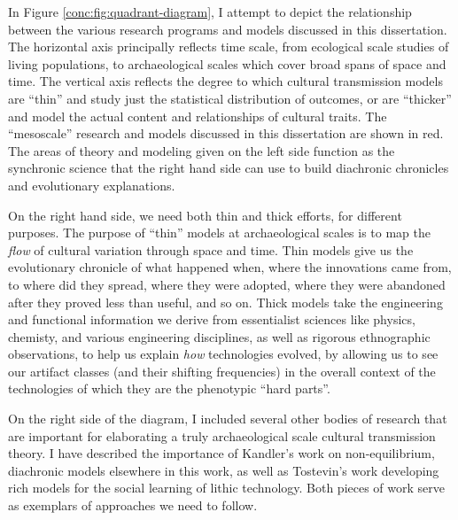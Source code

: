 In Figure \ref{conc:fig:quadrant-diagram}, I attempt to depict the relationship between the various research programs and models discussed in this dissertation.  The horizontal axis principally reflects time scale, from ecological scale studies of living populations, to archaeological scales which cover broad spans of space and time.  The vertical axis reflects the degree to which cultural transmission models are ``thin'' and study just the statistical distribution of outcomes, or are ``thicker'' and model the actual content and relationships of cultural traits.  The ``mesoscale'' research and  models discussed in this dissertation are shown in red.  The areas of theory and modeling given on the left side function as the synchronic science that the right hand side can use to build diachronic chronicles and evolutionary explanations. 

On the right hand side, we need both thin and thick efforts, for different purposes.  The purpose of ``thin'' models at archaeological scales is to map the \emph{flow} of cultural variation through space and time.  Thin models give us the evolutionary chronicle of what happened when, where the innovations came from, to where did they spread, where they were adopted, where they were abandoned after they proved less than useful, and so on.  Thick models take the engineering and functional information we derive from essentialist sciences like physics, chemisty, and various engineering disciplines, as well as rigorous ethnographic observations, to help us explain \emph{how} technologies evolved, by allowing us to see our artifact classes (and their shifting frequencies) in the overall context of the technologies of which they are the phenotypic ``hard parts''.  

On the right side of the diagram, I included several other bodies of research that are important for elaborating a truly archaeological scale cultural transmission theory.  I have described the importance of Kandler's \citeyearpar{Kandler2013} work on non-equilibrium, diachronic models elsewhere in this work, as well as Tostevin's \citeyearpar{tostevin2012seeing,tostevin2019content} work developing rich models for the social learning of lithic technology.  Both pieces of work serve as exemplars of approaches we need to follow.  


